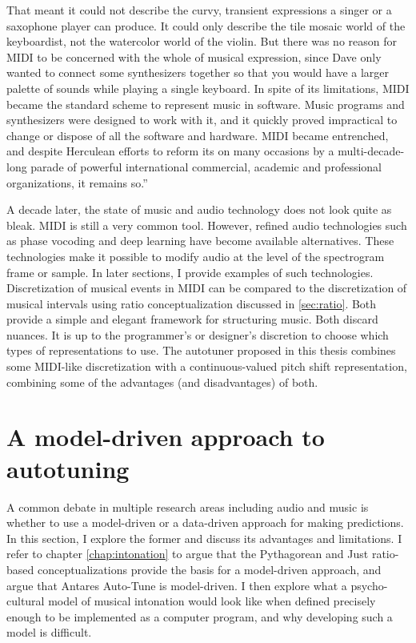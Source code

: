 That meant it could not describe the curvy, transient expressions a singer or a saxophone player can produce. It could only describe the tile mosaic world of the keyboardist, not the watercolor world of the violin. But there was no reason for MIDI to be concerned with the whole of musical expression, since Dave only wanted to connect some synthesizers together so that you would have a larger palette of sounds while playing a single keyboard. In spite of its limitations, MIDI became the standard scheme to represent music in software. Music programs and synthesizers were designed to work with it, and it quickly proved impractical to change or dispose of all the software and hardware. MIDI became entrenched, and despite Herculean efforts to reform its on many occasions by a multi-decade-long parade of powerful international commercial, academic and professional organizations, it remains so.'' \cite[p.~7]{lanier2010you}

A decade later, the state of music and audio technology does not look quite as bleak. MIDI is still a very common tool. However, refined audio technologies such as phase vocoding and deep learning have become available alternatives. These technologies make it possible to modify audio at the level of the spectrogram frame or sample. In later sections, I provide examples of such technologies. Discretization of musical events in MIDI can be compared to the discretization of musical intervals using ratio conceptualization discussed in \ref{sec:ratio}. Both provide a simple and elegant framework for structuring music. Both discard nuances. It is up to the programmer's or designer's discretion to choose which types of representations to use. The autotuner proposed in this thesis combines some MIDI-like discretization with a continuous-valued pitch shift representation, combining some of the advantages (and disadvantages) of both.

\section{A model-driven approach to autotuning}
A common debate in multiple research areas including audio and music is whether to use a model-driven or a data-driven approach for making predictions. In this section, I explore the former and discuss its advantages and limitations. I refer to chapter \ref{chap:intonation} to argue that the Pythagorean and Just ratio-based conceptualizations provide the basis for a model-driven approach, and argue that Antares Auto-Tune is model-driven. I then explore what a psycho-cultural model of musical intonation \cite{parncutt2018psychocultural} would look like when defined precisely enough to be implemented as a computer program, and why developing such a model is difficult. 

